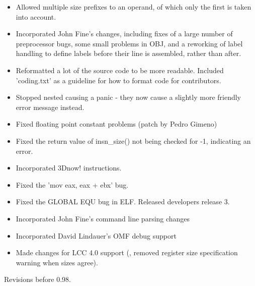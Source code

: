 \begin{itemize}
{        now generates an error message.}
    \item{Allowed multiple size prefixes to an operand, of which only the first
        is taken into account.}
    \item{Incorporated John Fine's changes, including fixes of a large number
        of preprocessor bugs, some small problems in OBJ, and a reworking of
        label handling to define labels before their line is assembled, rather
        than after.}
    \item{Reformatted a lot of the source code to be more readable. Included
        'coding.txt' as a guideline for how to format code for contributors.}
    \item{Stopped nested  causing a panic - they now cause a slightly more
        friendly error message instead.}
    \item{Fixed floating point constant problems (patch by Pedro Gimeno)}
    \item{Fixed the return value of insn\_size() not being checked for -1, indicating
        an error.}
    \item{Incorporated 3Dnow! instructions.}
    \item{Fixed the 'mov eax, eax + ebx' bug.}
    \item{Fixed the GLOBAL EQU bug in ELF. Released developers release 3.}
    \item{Incorporated John Fine's command line parsing changes}
    \item{Incorporated David Lindauer's OMF debug support}
    \item{Made changes for LCC 4.0 support (, removed register size
        specification warning when sizes agree).}
\end{itemize}


Revisions before 0.98.



